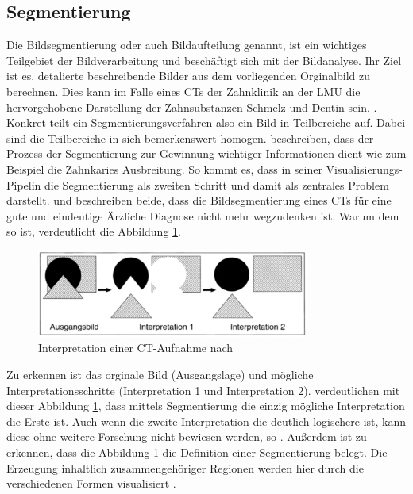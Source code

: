 \subsection{Segmentierung}
\label{subsec:segmentierung} Die Bildsegmentierung oder auch Bildaufteilung genannt,
ist ein wichtiges Teilgebiet der Bildverarbeitung und beschäftigt sich mit der
Bildanalyse. Ihr Ziel ist es, detalierte beschreibende Bilder aus dem
vorliegenden Orginalbild zu berechnen. Dies kann im Falle eines \ac{CT}s der Zahnklinik
an der \ac{LMU} die hervorgehobene Darstellung der Zahnsubstanzen Schmelz und
Dentin sein. \citep[vgl.][Seite 359]{lehmann2013bildverarbeitung}. Konkret teilt
ein Segmentierungsverfahren also ein Bild in Teilbereiche auf. Dabei sind die Teilbereiche
in sich bemerkenswert homogen. \citet[Seite 1]{ramesh2021} beschreiben, dass der
Prozess der Segmentierung zur Gewinnung wichtiger Informationen dient wie zum Beispiel
die Zahnkaries Ausbreitung. So kommt es, dass \citet[Seite 50]{handels2000} in seiner
Visualisierungs-Pipelin die Segmentierung als zweiten Schritt und damit als zentrales
Problem darstellt. \citet[Seite 95]{handels2000} und \citet[Seite 360]{lehmann2013bildverarbeitung}
beschreiben beide, dass die Bildsegmentierung eines \ac{CT}s für eine gute und eindeutige
Ärzliche Diagnose nicht mehr wegzudenken ist. Warum dem so ist, verdeutlicht die
Abbildung \ref{fig:interpretation_einer_ct_aufnahem}.

\begin{figure}[h]
	\centering
	\includegraphics[width=0.8\textwidth]{img/bild_interpretation.jpg}
	\caption{Interpretation einer \ac{CT}-Aufnahme nach \citet[Seite 360]{lehmann2013bildverarbeitung}}
	\label{fig:interpretation_einer_ct_aufnahem}
\end{figure}

Zu erkennen ist das orginale Bild (Ausgangslage) und mögliche
Interpretationsschritte (Interpretation 1 und Interpretation 2). \citet[Seite 360]{lehmann2013bildverarbeitung}
verdeutlichen mit dieser Abbildung \ref{fig:interpretation_einer_ct_aufnahem},
dass mittels Segmentierung die einzig mögliche Interpretation die Erste ist. Auch
wenn die zweite Interpretation die deutlich logischere ist, kann diese ohne
weitere Forschung nicht bewiesen werden, so \citet[Seite 360]{lehmann2013bildverarbeitung}.
Außerdem ist zu erkennen, dass die Abbildung \ref{fig:interpretation_einer_ct_aufnahem}
die Definition einer Segmentierung belegt. Die Erzeugung inhaltlich
zusammengehöriger Regionen werden hier durch die verschiedenen Formen
visualisiert \citep[vgl.][Seite 360]{lehmann2013bildverarbeitung}.

